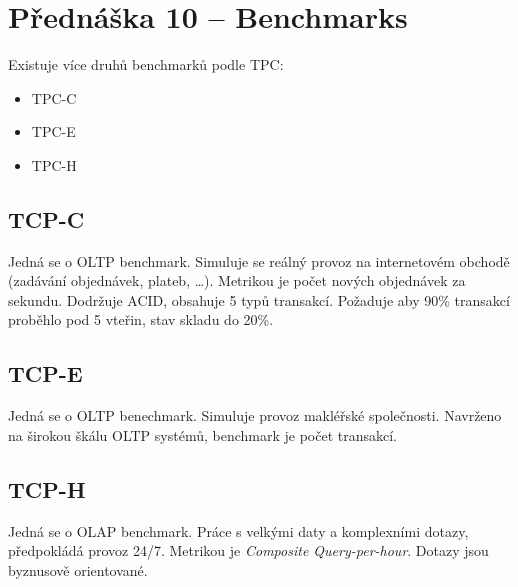 \section{Přednáška 10 -- Benchmarks}

Existuje více druhů benchmarků podle TPC:

\begin{itemize}
    \item TPC-C
    \item TPC-E
    \item TPC-H
\end{itemize}

\subsection*{TCP-C}

Jedná se o OLTP benchmark.
Simuluje se reálný provoz na internetovém obchodě (zadávání objednávek, plateb, \dots).
Metrikou je počet nových objednávek za sekundu.
Dodržuje ACID, obsahuje 5 typů transakcí.
Požaduje aby 90\% transakcí proběhlo pod 5 vteřin, stav skladu do 20\%.

\subsection*{TCP-E}

Jedná se o OLTP benechmark.
Simuluje provoz makléřské společnosti.
Navrženo na širokou škálu OLTP systémů, benchmark je počet transakcí.

\subsection*{TCP-H}

Jedná se o OLAP benchmark.
Práce s velkými daty a komplexními dotazy, předpokládá provoz 24/7.
Metrikou je \textit{Composite Query-per-hour}.
Dotazy jsou byznusově orientované.

